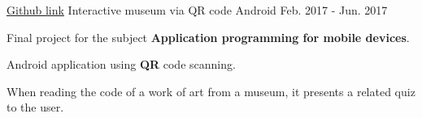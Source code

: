 \begin{cventries}
  \cventry
    {\href{https://github.com/matl1995/PDM/tree/master/Museo}{Github link}} %
    {Interactive museum via QR code} %
    {Android} %
    {Feb. 2017 - Jun. 2017} %
    {
      \begin{cvitems} %
        \item {Final project for the subject \textbf{Application programming for mobile devices}.}
        \item {Android application using \textbf{QR} code scanning.}
        \item {When reading the code of a work of art from a museum, it presents a related quiz to the user.}
      \end{cvitems}
    }

\end{cventries}
